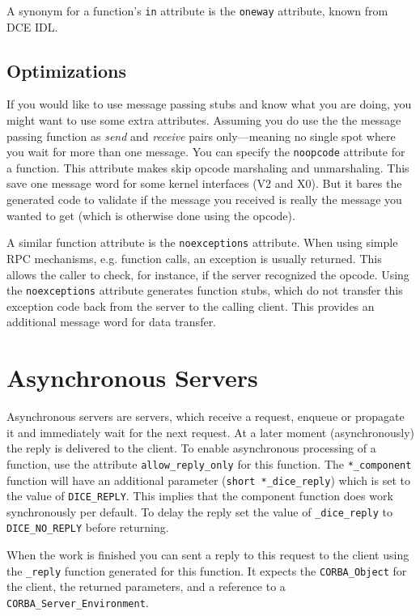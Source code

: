 A synonym for a function's \verb|in| attribute is the \verb|oneway|
attribute, known from DCE IDL.

\subsection{Optimizations}
If you would like to use message passing stubs and know what you are
doing, you might want to use some extra attributes. Assuming you do
use the the message passing function as \emph{send} and \emph{receive}
pairs only---meaning no single spot where you wait for more than one
message. You can specify the \verb|noopcode| attribute for a function.
This attribute makes \dice{} skip opcode marshaling and unmarshaling.
This save one message word for some kernel interfaces (V2 and X0).
But it bares the generated code to validate if the message you received
is really the message you wanted to get (which is otherwise done using
the opcode).

A similar function attribute is the \verb|noexceptions| attribute. When
using simple RPC mechanisms, e.g. function calls, an exception is 
usually returned. This allows the caller to check, for instance, if the
server recognized the opcode. Using the \verb|noexceptions| attribute
generates function stubs, which do not transfer this exception code
back from the server to the calling client. This provides an additional
message word for data transfer.

\section{Asynchronous Servers}
\label{sec:asynchronous}
Asynchronous servers are servers, which receive a request, enqueue or
propagate it and immediately wait for the next request. At a later 
moment (asynchronously) the reply is delivered to the client. To
enable asynchronous processing of a function, use the attribute 
\verb|allow_reply_only| for this function. The \verb|*_component| function
will have an additional parameter (\verb|short *_dice_reply|) which is
set to the value of \verb|DICE_REPLY|. This implies that the component
function does work synchronously per default. To delay the reply
set the value of \verb|_dice_reply| to \verb|DICE_NO_REPLY| before
returning.

When the work is finished you can sent a reply to this request to 
the client using the \verb|_reply| function generated for this
function. It expects the \verb|CORBA_Object| for the client, the
returned parameters, and a reference to a \verb|CORBA_Server_Environment|.


